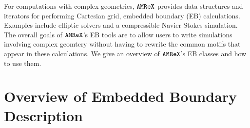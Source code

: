 \newcommand{\xbold}{{\bf x}}
\newcommand{\ebis}{{\tt EBIndexSpace}}
\newcommand{\baseif}{{\tt BaseIF}}
\newcommand{\sphereif}{{\tt SphereIF}}
\newcommand{\transformif}{{\tt TransformIF}}
\newcommand{\latheif}{{\tt LatheIF}}
\newcommand{\unionif}{{\tt UnionIF}}
\newcommand{\intersectionif}{{\tt IntersectionIF}}
\newcommand{\geom}{{\tt GeometryShop}}
\newcommand{\parm}{{\tt ParmParse}}

For computations with complex geometries, $\tt{AMReX}$ provides data
structures and iterators for performing Cartesian grid, embedded
boundary (EB) calculations.   Examples include elliptic solvers and a
compressible Navier Stokes simulation.  
The overall goals of $\tt{AMReX}$'s EB tools are to allow users 
to write simulations involving complex geomtery  without having to
rewrite the common motifs that appear in these calculations.  
We give an overview of $\tt{AMReX}$'s EB classes and how to use them.

\section{Overview of Embedded Boundary Description}
\label{sec:EB:EBOverview}


